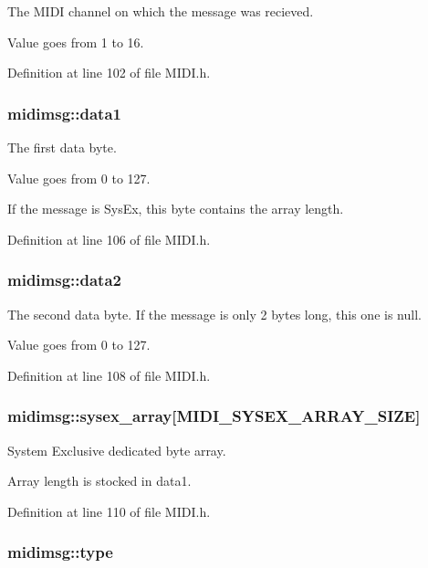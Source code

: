 The MIDI channel on which the message was recieved. \par
 Value goes from 1 to 16. 

Definition at line 102 of file MIDI.h.\hypertarget{structmidimsg_d0a225fbc23de9f631331d6aa52ab981}{
\subsubsection[{data1}]{ {\bf midimsg::data1}}}
\label{structmidimsg_d0a225fbc23de9f631331d6aa52ab981}


The first data byte.\par
 Value goes from 0 to 127.\par
 If the message is SysEx, this byte contains the array length. 

Definition at line 106 of file MIDI.h.\hypertarget{structmidimsg_240be209353b132d10757bf345146e6b}{
\subsubsection[{data2}]{ {\bf midimsg::data2}}}
\label{structmidimsg_240be209353b132d10757bf345146e6b}


The second data byte. If the message is only 2 bytes long, this one is null.\par
 Value goes from 0 to 127. 

Definition at line 108 of file MIDI.h.\hypertarget{structmidimsg_253df8383f977227e7d45ba488d98601}{
\subsubsection[{sysex\_\-array}]{ {\bf midimsg::sysex\_\-array}\mbox{[}MIDI\_\-SYSEX\_\-ARRAY\_\-SIZE\mbox{]}}}
\label{structmidimsg_253df8383f977227e7d45ba488d98601}


System Exclusive dedicated byte array. \par
 Array length is stocked in data1. 

Definition at line 110 of file MIDI.h.\hypertarget{structmidimsg_c2aa51d6154e6434f4426f925c6e5287}{
\subsubsection[{type}]{ {\bf midimsg::type}}}
\label{structmidimsg_c2aa51d6154e6434f4426f925c6e5287}


